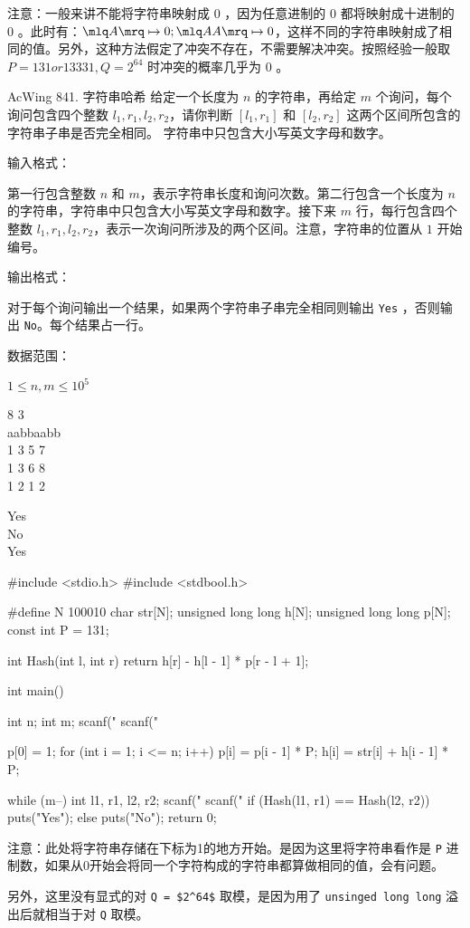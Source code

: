注意：一般来讲不能将字符串映射成 $0$ ，因为任意进制的 $0$ 都将映射成十进制的 $0$ 。此时有：$\mlq A \mrq \mapsto 0; \mlq AA \mrq \mapsto 0$，这样不同的字符串映射成了相同的值。另外，这种方法假定了冲突不存在，不需要解决冲突。按照经验一般取 $P = 131 or 13331, Q = 2^{64}$ 时冲突的概率几乎为 $0$ 。

\begin{titledbox}{AcWing 841. 字符串哈希}
给定一个长度为 $n$ 的字符串，再给定 $m$ 个询问，每个询问包含四个整数 $l_1, r_1, l_2, r_2$，请你判断 $[l_1, r_1]$ 和 $[l_2, r_2]$ 这两个区间所包含的字符串子串是否完全相同。
字符串中只包含大小写英文字母和数字。

输入格式：

第一行包含整数 $n$ 和 $m$，表示字符串长度和询问次数。第二行包含一个长度为 $n$ 的字符串，字符串中只包含大小写英文字母和数字。接下来 $m$ 行，每行包含四个整数 $l_1, r_1, l_2, r_2$，表示一次询问所涉及的两个区间。注意，字符串的位置从 $1$ 开始编号。

输出格式：

对于每个询问输出一个结果，如果两个字符串子串完全相同则输出 \lstinline{Yes} ，否则输出 \lstinline{No}。每个结果占一行。

数据范围：

$1 \le n, m \le 10^5$

\begin{inputblock}
    8 3 \\
    aabbaabb \\
    1 3 5 7 \\
    1 3 6 8 \\
    1 2 1 2
\end{inputblock}
\begin{outputblock}
    Yes \\
    No \\
    Yes
\end{outputblock}
\end{titledbox}

\begin{mycpptwocol}[字符串前缀哈希法]
#include <stdio.h>
#include <stdbool.h>

#define N 100010
char str[N];
unsigned long long h[N];
unsigned long long p[N];
const int P = 131;

int Hash(int l, int r)
{
    return h[r] - h[l - 1] * p[r - l + 1];
}

int main()
{
    int n;
    int m;
    scanf("%
    scanf("%

    p[0] = 1;
    for (int i = 1; i <= n; i++) {
        p[i] = p[i - 1] * P;
        h[i] = str[i] + h[i - 1] * P;
    }

    while (m--) {
        int l1, r1, l2, r2;
        scanf("%
        scanf("%
        if (Hash(l1, r1) == Hash(l2, r2)) {
            puts("Yes");
        } else {
            puts("No");
        }
    }
    return 0;
}
\end{mycpptwocol}

\begin{information}
    注意：此处将字符串存储在下标为1的地方开始。是因为这里将字符串看作是 \lstinline{P} 进制数，如果从0开始会将同一个字符构成的字符串都算做相同的值，会有问题。
    
    另外，这里没有显式的对 \lstinline{Q = $2^64$} 取模，是因为用了 \lstinline{unsinged long long} 溢出后就相当于对 \lstinline{Q} 取模。
\end{information}

